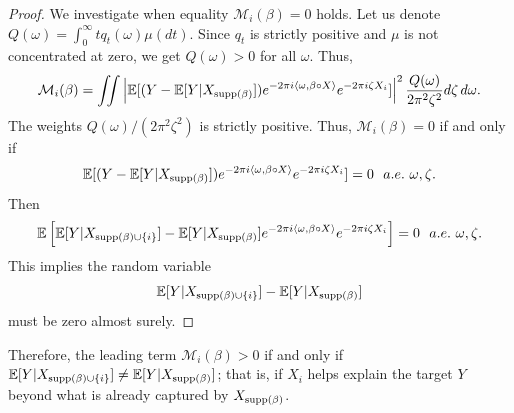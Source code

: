 \documentclass[sn-mathphys-num]{sn-jnl}%
\numberwithin{equation}{section}
\newcommand{\R}{\mathbb{R}}
\newcommand{\E}{\mathbb{E}}
\newcommand{\supp}{\mathop{\rm supp}}
\theoremstyle{thmstyleone}%
\theoremstyle{thmstyletwo}%
\newtheorem{remark}{Remark}%
\theoremstyle{thmstylethree}%
\begin{document}
\begin{proof} 
We investigate when equality $\mathcal{M}_i(\beta) = 0$ holds. Let us denote  
$Q(\omega) = \int_0^\infty t q_t(\omega) \mu(dt)$. 
Since $q_t$ is 
strictly positive and $\mu$ is not concentrated at zero, we get $Q(\omega) > 0$ for all $\omega$. Thus, 
\begin{equation*}
	 \mathcal{M}_i(\beta) = \iint \left|\mathbb{E}[(Y-\E[Y|X_{\supp(\beta)}]) e^{-2\pi i \langle \omega, \beta \circ X \rangle}  e^{-2\pi i \zeta X_i}]\right|^2 \frac{Q(\omega)}{2\pi^2 \zeta^2} d\zeta  \, d\omega.
\end{equation*}
The weights $Q(\omega)/(2\pi^2 \zeta^2)$ is strictly positive. Thus, $\mathcal{M}_i (\beta) = 0$ if and only if 
\begin{equation*}
	\mathbb{E}[(Y-\E[Y|X_{\supp(\beta)}]) e^{-2\pi i \langle \omega, \beta \circ X \rangle}  e^{-2\pi i \zeta X_i}] = 0~~a.e.~\omega, \zeta.
\end{equation*}
Then 
\begin{equation*}
	\E\left[\E[Y|X_{\supp(\beta) \cup \{i\}}]-\E[Y|X_{\supp(\beta)}]e^{-2\pi i \langle \omega, \beta \circ X \rangle}  e^{-2\pi i \zeta X_i}\right] = 0~~a.e.~\omega, \zeta.
\end{equation*} 
This implies the random variable 
\begin{equation*}
\E[Y|X_{\supp(\beta) \cup \{i\}}]-\E[Y|X_{\supp(\beta)}]
\end{equation*} 
 must be zero almost surely. 
\end{proof} 

Therefore, the leading term $\mathcal{M}_i(\beta) > 0$  if and only if $\E[Y | X_{\supp(\beta) \cup \{i\}}] \ne  \E[Y|X_{\supp(\beta)}]$; that is, if $X_i$ helps explain the target $Y$ beyond what is already captured by $X_{\supp(\beta)}$. 

\end{document}

